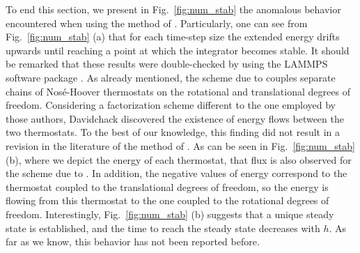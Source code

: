 \documentclass[
journal=jctcce,
layout=twocolumn
]{achemso}
\begin{document}
To end this section, we present in Fig.~\ref{fig:num_stab} the anomalous behavior encountered when using the method of \citeauthor{Kamberaj_2005} \cite{Kamberaj_2005}.
Particularly, one can see from Fig.~\ref{fig:num_stab} (a) that for each time-step size the extended energy drifts upwards until reaching a point at which the integrator becomes stable.
It should be remarked that these results were double-checked by using the LAMMPS software package \cite{Plimpton_1995}. 
As already mentioned, the scheme due to \citeauthor{Kamberaj_2005} \cite{Kamberaj_2005} couples separate chains of Nos\'{e}-Hoover thermostats on the rotational and translational degrees of freedom.
Considering a factorization scheme different to the one employed by those authors, Davidchack \cite{Davidchack_2009} discovered the existence of energy flows between the two thermostats.
To the best of our knowledge, this finding did not result in a revision in the literature of the method of \citeauthor{Kamberaj_2005} \cite{Kamberaj_2005}.
As can be seen in Fig.~\ref{fig:num_stab} (b), where we depict the energy of each thermostat, that flux is also observed for the scheme due to \citeauthor{Kamberaj_2005} \cite{Kamberaj_2005}.
In addition, the negative values of energy correspond to the thermostat coupled to the translational degrees of freedom, so the energy is flowing from this thermostat to the one coupled to the rotational degrees of freedom.
Interestingly, Fig.~\ref{fig:num_stab} (b) suggests that a unique steady state is established, and the time to reach the steady state decreases with $h$. As far as we know, this behavior has not been reported before.
\end{document}
